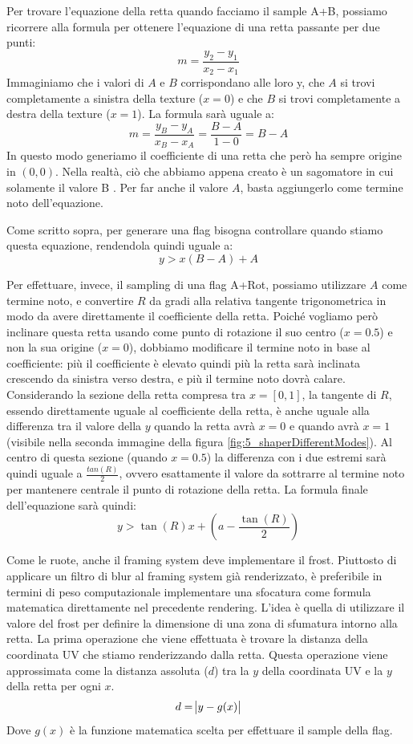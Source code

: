 \documentclass[main.tex]{subfiles}
\begin{document}
Per trovare l'equazione della retta quando facciamo il sample A+B, possiamo ricorrere alla formula per ottenere l'equazione di una retta passante per due punti:
\[m = \frac{y_2 - y_1}{x_2 - x_1}\]
Immaginiamo che i valori di $A$ e $B$ corrispondano alle loro y, che $A$ si trovi completamente a sinistra della texture ($x = 0$) e che $B$ si trovi completamente a destra della texture ($x = 1$). La formula sarà uguale a:
\[m = \frac{y_B - y_A}{x_B - x_A} = \frac{B - A}{1 - 0} = B - A\]
In questo modo generiamo il coefficiente di una retta che però ha sempre origine in $(0, 0)$. Nella realtà, ciò che abbiamo appena creato è un sagomatore in cui solamente il valore B . Per far  anche il valore $A$, basta aggiungerlo come termine noto dell'equazione.

Come scritto sopra, per generare una flag bisogna controllare quando stiamo  questa equazione, rendendola quindi uguale a:
\[y > x(B - A) + A\]
\newline

Per effettuare, invece, il sampling di una flag A+Rot, possiamo utilizzare $A$ come termine noto, e convertire $R$ da gradi alla relativa tangente trigonometrica in modo da avere direttamente il coefficiente della retta. Poiché vogliamo però inclinare questa retta usando come punto di rotazione il suo centro ($x = 0.5$) e non la sua origine ($x = 0$), dobbiamo modificare il termine noto in base al coefficiente: più il coefficiente è elevato quindi più la retta sarà inclinata crescendo da sinistra verso destra, e più il termine noto dovrà calare. Considerando la sezione della retta compresa tra $x = [0, 1]$, la tangente di $R$, essendo direttamente uguale al coefficiente della retta, è anche uguale alla differenza tra il valore della $y$ quando la retta avrà $x = 0$ e quando avrà $x = 1$ (visibile nella seconda immagine della figura \ref{fig:5_shaperDifferentModes}). Al centro di questa sezione (quando $x = 0.5$) la differenza con i due estremi sarà quindi uguale a $\frac{tan(R)}{2}$, ovvero esattamente il valore da sottrarre al termine noto per mantenere centrale il punto di rotazione della retta. La formula finale dell'equazione sarà quindi:
\[y > \tan(R)x + (a - \frac{\tan(R)}{2})\]

Come le ruote, anche il framing system deve implementare il frost. Piuttosto di applicare un filtro di blur al framing system già renderizzato, è preferibile in termini di peso computazionale implementare una sfocatura come formula matematica direttamente nel precedente rendering. L'idea è quella di utilizzare il valore del frost per definire la dimensione di una zona di sfumatura intorno alla retta. La prima operazione che viene effettuata è trovare la distanza della coordinata UV che stiamo renderizzando dalla retta. Questa operazione viene approssimata come la distanza assoluta ($d$) tra la $y$ della coordinata UV e la $y$ della retta per ogni $x$.
\[d = \abs{y - g(x)}\]
Dove $g(x)$ è la funzione matematica scelta per effettuare il sample della flag.
\end{document}
